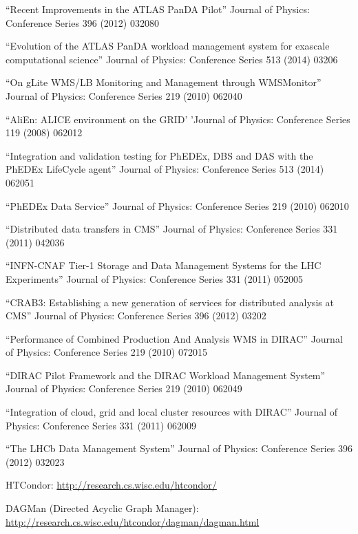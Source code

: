\begin{thebibliography}{99}
 ``Recent Improvements in the ATLAS PanDA Pilot'' Journal of Physics: Conference Series 396 (2012) 032080

 ``Evolution of the ATLAS PanDA workload management system for exascale computational science'' Journal of Physics: Conference Series 513 (2014) 03206

 ``On gLite WMS/LB Monitoring and Management through WMSMonitor'' Journal of Physics: Conference Series 219 (2010) 062040

 ``AliEn: ALICE environment on the GRID' 'Journal of Physics: Conference Series 119 (2008) 062012

 ``Integration and validation testing for PhEDEx, DBS and DAS with the PhEDEx LifeCycle agent'' Journal of Physics: Conference Series 513 (2014) 062051

 ``PhEDEx Data Service'' Journal of Physics: Conference Series 219 (2010) 062010

 ``Distributed data transfers in CMS'' Journal of Physics: Conference Series 331 (2011) 042036

 ``INFN-CNAF Tier-1 Storage and Data Management Systems for the LHC Experiments'' Journal of Physics: Conference Series 331 (2011) 052005

 ``CRAB3: Establishing a new generation of services for distributed analysis at CMS'' Journal of Physics: Conference Series 396 (2012) 03202

 ``Performance of Combined Production And Analysis WMS in DIRAC'' Journal of Physics: Conference Series 219 (2010) 072015

 ``DIRAC Pilot Framework and the DIRAC Workload Management System'' Journal of Physics: Conference Series 219 (2010) 062049

 ``Integration of cloud, grid and local cluster resources with DIRAC'' Journal of Physics: Conference Series 331 (2011) 062009

 ``The LHCb Data Management System'' Journal of Physics: Conference Series 396 (2012) 032023

 HTCondor: \url{http://research.cs.wisc.edu/htcondor/}

 DAGMan (Directed Acyclic Graph Manager): \url{http://research.cs.wisc.edu/htcondor/dagman/dagman.html}


\end{thebibliography}
